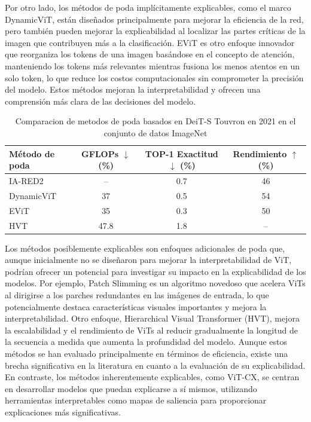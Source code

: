 Por otro lado, los métodos de poda implícitamente explicables, como el marco DynamicViT, están diseñados principalmente para mejorar la eficiencia de la red, pero también pueden mejorar la explicabilidad al localizar las partes críticas de la imagen que contribuyen más a la clasificación. EViT es otro enfoque innovador que reorganiza los tokens de una imagen basándose en el concepto de atención, manteniendo los tokens más relevantes mientras fusiona los menos atentos en un solo token, lo que reduce los costos computacionales sin comprometer la precisión del modelo. Estos métodos mejoran la interpretabilidad y ofrecen una comprensión más clara de las decisiones del modelo.   

\begin{table}[H]
	\centering
	\caption{ Comparacion de metodos de poda basados en DeiT-S Touvron en 2021 en el conjunto de datos ImageNet}
	\label{tab:pruning_comparison}
	\begin{tabular}{lccc}
		\toprule
	Método de poda & GFLOPs $\downarrow$ (\%) & TOP-1 Exactitud $\downarrow$ (\%) & Rendimiento $\uparrow$ (\%) \\
		\midrule
		IA-RED2        & --                        & 0.7                               & 46                            \\
		DynamicViT     & 37                        & 0.5                               & 54                            \\
		EViT           & 35                        & 0.3                               & 50                            \\
                           
		HVT            & 47.8                      & 1.8                               & --                            \\
		\bottomrule
	\end{tabular}
\end{table}


Los métodos posiblemente explicables son enfoques adicionales de poda que, aunque inicialmente no se diseñaron para mejorar la interpretabilidad de ViT, podrían ofrecer un potencial para investigar su impacto en la explicabilidad de los modelos. Por ejemplo, Patch Slimming es un algoritmo novedoso que acelera ViTs al dirigirse a los parches redundantes en las imágenes de entrada, lo que potencialmente destaca características visuales importantes y mejora la interpretabilidad. Otro enfoque, Hierarchical Visual Transformer (HVT), mejora la escalabilidad y el rendimiento de ViTs al reducir gradualmente la longitud de la secuencia a medida que aumenta la profundidad del modelo. Aunque estos métodos se han evaluado principalmente en términos de eficiencia, existe una brecha significativa en la literatura en cuanto a la evaluación de su explicabilidad. En contraste, los métodos inherentemente explicables, como ViT-CX, se centran en desarrollar modelos que puedan explicarse a sí mismos, utilizando herramientas interpretables como mapas de saliencia para proporcionar explicaciones más significativas.

